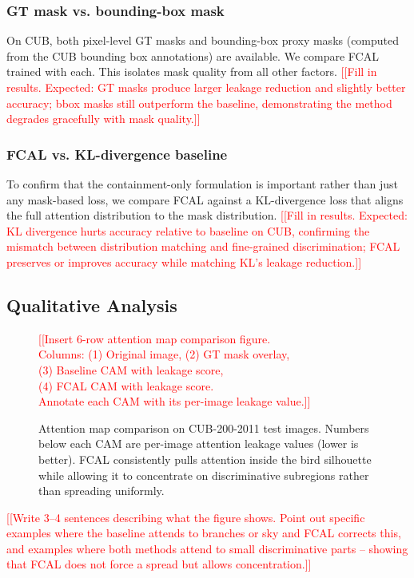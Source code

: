 \documentclass[journal]{IEEEtran}
\newcommand{\ph}[1]{\textcolor{red}{[#1]}}
\begin{document}
\subsubsection{GT mask vs. bounding-box mask}
On CUB, both pixel-level GT masks and bounding-box proxy masks
(computed from the CUB bounding box annotations) are available.
We compare FCAL trained with each. This isolates mask quality
from all other factors. \ph{[Fill in results. Expected: GT masks
produce larger leakage reduction and slightly better accuracy;
bbox masks still outperform the baseline, demonstrating the method
degrades gracefully with mask quality.]}

\subsubsection{FCAL vs. KL-divergence baseline}
To confirm that the containment-only formulation is important
rather than just any mask-based loss, we compare FCAL against
a KL-divergence loss that aligns the full attention distribution
to the mask distribution. \ph{[Fill in results. Expected: KL
divergence hurts accuracy relative to baseline on CUB, confirming
the mismatch between distribution matching and fine-grained
discrimination; FCAL preserves or improves accuracy while matching
KL's leakage reduction.]}

\subsection{Qualitative Analysis}

\begin{figure}[htbp]
  \centering
  \ph{[Insert 6-row attention map comparison figure.\\
  Columns: (1) Original image, (2) GT mask overlay,\\
  (3) Baseline CAM with leakage score,\\
  (4) FCAL CAM with leakage score.\\
  Annotate each CAM with its per-image leakage value.]}
  \caption{Attention map comparison on CUB-200-2011 test images.
    Numbers below each CAM are per-image attention leakage values
    (lower is better). FCAL consistently pulls attention inside
    the bird silhouette while allowing it to concentrate on
    discriminative subregions rather than spreading uniformly.}
  \label{fig:attention_viz}
\end{figure}

\ph{[Write 3--4 sentences describing what the figure shows.
Point out specific examples where the baseline attends to branches
or sky and FCAL corrects this, and examples where both methods
attend to small discriminative parts -- showing that FCAL does not
force a spread but allows concentration.]}
\end{document}

